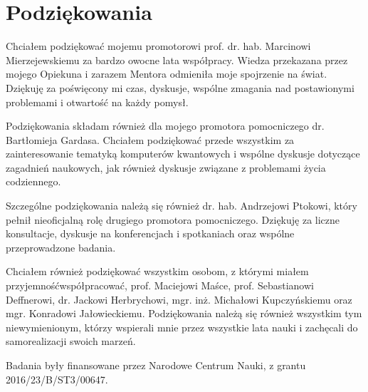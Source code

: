 \chapter*{Podziękowania}

Chciałem podziękować mojemu promotorowi prof. dr. hab. Marcinowi Mierzejewskiemu za bardzo owocne lata współpracy.
Wiedza przekazana przez mojego Opiekuna i zarazem Mentora odmieniła moje spojrzenie na świat. 
Dziękuję za poświęcony mi czas, dyskusje, wspólne zmagania nad postawionymi problemami i otwartość na każdy pomysł.

Podziękowania składam również dla mojego promotora pomocniczego dr. Bartłomieja Gardasa.
Chciałem podziękować przede wszystkim za zainteresowanie tematyką komputerów kwantowych i wspólne dyskusje dotyczące zagadnień naukowych, jak również dyskusje związane z problemami życia codziennego.

Szczególne podziękowania należą się również dr. hab. Andrzejowi Ptokowi, który pełnił nieoficjalną rolę drugiego promotora pomocniczego.
Dziękuję za liczne konsultacje, dyskusje na konferencjach i spotkaniach oraz wspólne przeprowadzone badania.

Chciałem również podziękować wszystkim osobom, z którymi miałem przyjemność\linebreak współpracować, 
prof. Maciejowi Maśce, 
prof. Sebastianowi Deffnerowi,
dr. Jackowi Herbrychowi,
mgr. inż. Michałowi Kupczyńskiemu oraz
mgr. Konradowi Jałowieckiemu.
Podziękowania należą się również wszystkim tym niewymienionym, którzy wspierali mnie przez wszystkie lata nauki i zachęcali do samorealizacji swoich marzeń.

\ornament

\noindent
Badania były finansowane przez Narodowe Centrum Nauki, z grantu 2016/23/B/ST3/00647.
\cleardoublepage
